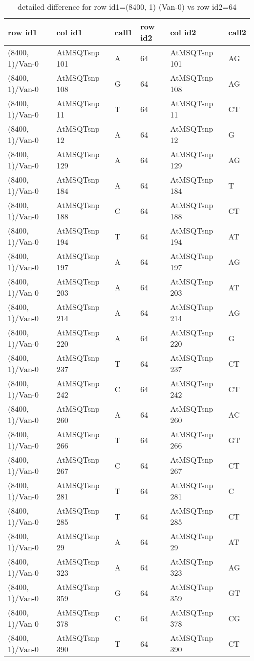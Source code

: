 \begin{center}
\begin{longtable}{|l|l|l|l|l|l|}
\caption{detailed difference for row id1=(8400, 1) (Van-0) vs row id2=64} \label{table_dm461}\\
\hline
row id1&col id1&call1&row id2&col id2&call2\\
\hline
(8400, 1)/Van-0&AtMSQTsnp 101&A&64&AtMSQTsnp 101&AG\\
(8400, 1)/Van-0&AtMSQTsnp 108&G&64&AtMSQTsnp 108&AG\\
(8400, 1)/Van-0&AtMSQTsnp 11&T&64&AtMSQTsnp 11&CT\\
(8400, 1)/Van-0&AtMSQTsnp 12&A&64&AtMSQTsnp 12&G\\
(8400, 1)/Van-0&AtMSQTsnp 129&A&64&AtMSQTsnp 129&AG\\
(8400, 1)/Van-0&AtMSQTsnp 184&A&64&AtMSQTsnp 184&T\\
(8400, 1)/Van-0&AtMSQTsnp 188&C&64&AtMSQTsnp 188&CT\\
(8400, 1)/Van-0&AtMSQTsnp 194&T&64&AtMSQTsnp 194&AT\\
(8400, 1)/Van-0&AtMSQTsnp 197&A&64&AtMSQTsnp 197&AG\\
(8400, 1)/Van-0&AtMSQTsnp 203&A&64&AtMSQTsnp 203&AT\\
(8400, 1)/Van-0&AtMSQTsnp 214&A&64&AtMSQTsnp 214&AG\\
(8400, 1)/Van-0&AtMSQTsnp 220&A&64&AtMSQTsnp 220&G\\
(8400, 1)/Van-0&AtMSQTsnp 237&T&64&AtMSQTsnp 237&CT\\
(8400, 1)/Van-0&AtMSQTsnp 242&C&64&AtMSQTsnp 242&CT\\
(8400, 1)/Van-0&AtMSQTsnp 260&A&64&AtMSQTsnp 260&AC\\
(8400, 1)/Van-0&AtMSQTsnp 266&T&64&AtMSQTsnp 266&GT\\
(8400, 1)/Van-0&AtMSQTsnp 267&C&64&AtMSQTsnp 267&CT\\
(8400, 1)/Van-0&AtMSQTsnp 281&T&64&AtMSQTsnp 281&C\\
(8400, 1)/Van-0&AtMSQTsnp 285&T&64&AtMSQTsnp 285&CT\\
(8400, 1)/Van-0&AtMSQTsnp 29&A&64&AtMSQTsnp 29&AT\\
(8400, 1)/Van-0&AtMSQTsnp 323&A&64&AtMSQTsnp 323&AG\\
(8400, 1)/Van-0&AtMSQTsnp 359&G&64&AtMSQTsnp 359&GT\\
(8400, 1)/Van-0&AtMSQTsnp 378&C&64&AtMSQTsnp 378&CG\\
(8400, 1)/Van-0&AtMSQTsnp 390&T&64&AtMSQTsnp 390&CT\\

\end{longtable}
\end{center}
